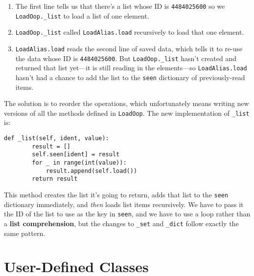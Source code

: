 \documentclass{scrbook}
\newcommand{\glossref}[1]{\textbf{#1}}
\begin{document}
\begin{enumerate}

\item 

The first line tells us that there's a list whose ID is \texttt{4484025600}
    so we \texttt{LoadOop.\_list} to load a list of one element.



\item 

\texttt{LoadOop.\_list} called \texttt{LoadAlias.load} recursively to load that one element.



\item 

\texttt{LoadAlias.load} reads the second line of saved data,
    which tells it to re-use the data whose ID is \texttt{4484025600}.
    But \texttt{LoadOop.\_list} hasn't created and returned that list yet—it
    is still reading in the elements—so
    \texttt{LoadAlias.load} hasn't had a chance to add the list to the \texttt{seen} dictionary
    of previously-read items.



\end{enumerate}


The solution is to reorder the operations,
which unfortunately means writing new versions
of all the methods defined in \texttt{LoadOop}.
The new implementation of \texttt{\_list} is:


\begin{lstlisting}[frame=single,frameround=tttt]
    def _list(self, ident, value):
        result = []
        self.seen[ident] = result
        for _ in range(int(value)):
            result.append(self.load())
        return result
\end{lstlisting}



This method creates the list it's going to return,
adds that list to the \texttt{seen} dictionary immediately,
and \emph{then} loads list items recursively.
We have to pass it the ID of the list
to use as the key in \texttt{seen},
and we have to use a loop rather than a \glossref{list comprehension},
but the changes to \texttt{\_set} and \texttt{\_dict} follow exactly the same pattern.

\section{User-Defined Classes}\label{persistence-extend}
\end{document}
